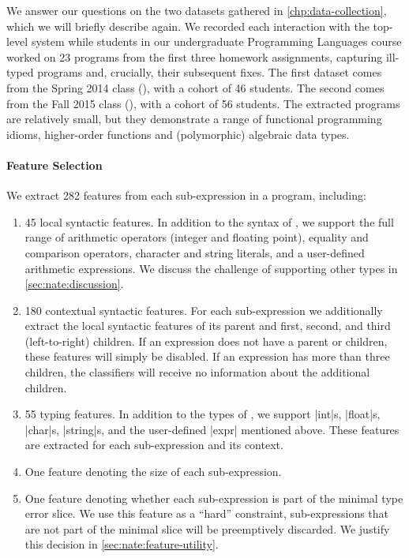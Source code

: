 \label{sec:nate:methodology}
We answer our questions on the two datasets gathered in
\autoref{chp:data-collection}, which we will briefly describe
again.
%
We recorded each interaction with the \ocaml top-level system while
students in our undergraduate Programming Languages course
worked on 23 programs from the first three homework
assignments, capturing ill-typed programs and, crucially, their
subsequent fixes.
%
The first dataset comes from the Spring 2014 class (\SPRING), with a
cohort of 46 students. The second comes from the Fall 2015 class
(\FALL), with a cohort of 56 students.
%
The extracted programs are relatively small, but they demonstrate a
range of functional programming idioms, \eg higher-order functions and
(polymorphic) algebraic data types.

\paragraph{Feature Selection}
We extract 282 features from each sub-expression in a
program, including:
%
\begin{enumerate}
\item 45 local syntactic features. In addition to the syntax of \lang,
  we support the full range of arithmetic operators (integer and
  floating point), equality and comparison operators, character and
  string literals, and a user-defined %
  arithmetic
  expressions. We discuss the challenge of supporting other
  types in \autoref{sec:nate:discussion}.
\item 180 contextual syntactic features. For each sub-expression we
  additionally extract the local syntactic features of its parent and
  first, second, and third (left-to-right) children. If an expression
  does not have a parent or children, these features will simply be
  disabled. If an expression has more than three children, the
  classifiers will receive no information about the additional
  children.
\item 55 typing features. In addition to the types of \lang, we support
  |int|s, |float|s, |char|s, |string|s, and the user-defined |expr|
  mentioned above. These features are extracted for each sub-expression
  and its context. %
\item One feature denoting the size of each sub-expression.
\item One feature denoting whether each sub-expression is part of the
  minimal type error slice. We use this feature as a ``hard''
  constraint, sub-expressions that are not part of the minimal slice
  will be preemptively discarded. We justify this decision in
  \autoref{sec:nate:feature-utility}.
\end{enumerate}

